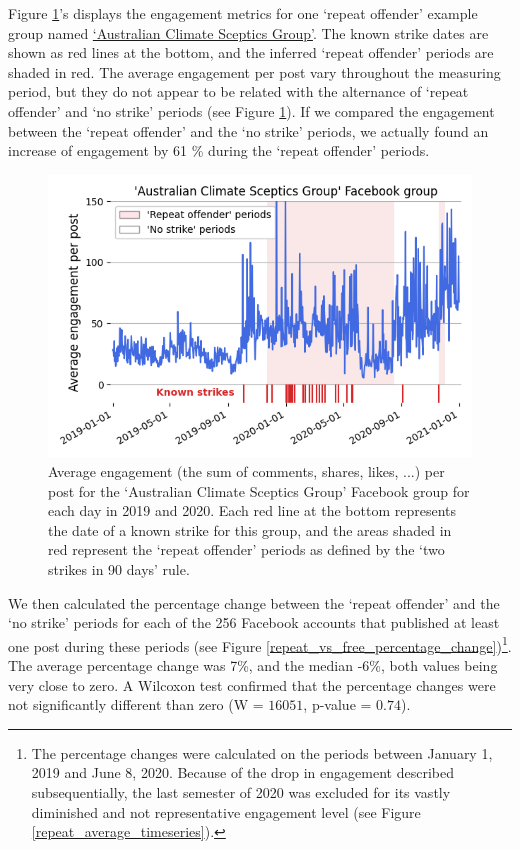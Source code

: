 \documentclass[11pt,a4paper]{article}
\begin{document}
Figure \ref{repeat_example_timeseries}'s displays the engagement metrics for one `repeat offender' example group named \href{https://www.facebook.com/groups/108655705888371/}{`Australian Climate Sceptics Group'}. 
The known strike dates are shown as red lines at the bottom, and the inferred ‘repeat offender’ periods are shaded in red. 
The average engagement per post vary throughout the measuring period, but they do not appear to be related with the alternance of `repeat offender' and `no strike' periods (see Figure \ref{repeat_example_timeseries}).
If we compared the engagement between the `repeat offender' and the `no strike' periods, we actually found an increase of engagement by 61 \% during the `repeat offender' periods.

\begin{figure}[!h]
\centering
\includegraphics[width=\linewidth]{./../figure/repeat_example_timeseries.png}
\caption{Average engagement (the sum of comments, shares, likes, ...) per post for the `Australian Climate Sceptics Group' Facebook group for each day in 2019 and 2020. Each red line at the bottom represents the date of a known strike for this group, and the areas shaded in red represent the `repeat offender' periods as defined by the ‘two strikes in 90 days’ rule.}
\label{repeat_example_timeseries}
\end{figure}

We then calculated the percentage change between the `repeat offender' and the `no strike' periods for each of the 256 Facebook accounts that published at least one post during these periods (see Figure \ref{repeat_vs_free_percentage_change})\footnote{The percentage changes were calculated on the periods between January 1, 2019 and June 8, 2020. Because of the drop in engagement described subsequentially, the last semester of 2020 was excluded for its vastly diminished and not representative engagement level (see Figure \ref{repeat_average_timeseries}).}.
The average percentage change was 7\%, and the median -6\%, both values being very close to zero. 
A Wilcoxon test confirmed that the percentage changes were not significantly different than zero (W = $16051$, p-value = $0.74$).
\end{document}
